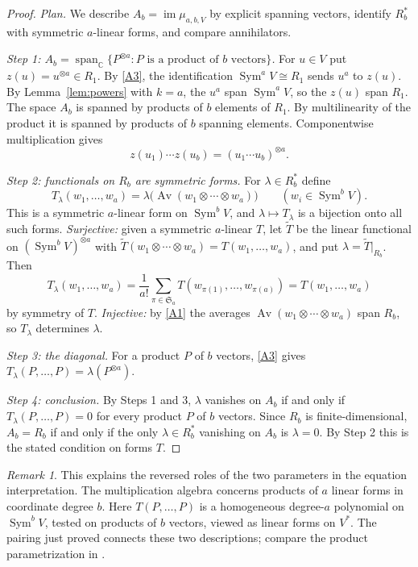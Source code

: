 \documentclass[11pt]{article}
\theoremstyle{remark}
\newtheorem{remark}[theorem]{Remark}
\DeclareMathOperator{\Sym}{Sym}
\DeclareMathOperator{\Av}{Av}
\newcommand{\C}{\mathbb C}
\newcommand{\Sa}{\mathfrak S_a}
\begin{document}
\begin{proof}
\emph{Plan.} We describe $A_b=\operatorname{im}\mu_{a,b,V}$ by explicit
spanning vectors, identify $R_b^*$ with symmetric $a$-linear forms, and
compare annihilators.

\emph{Step 1: $A_b=\operatorname{span}_{\C}\{P^{\otimes a}: P\text{ is a
product of }b\text{ vectors}\}$.}
For $u\in V$ put $z(u)=u^{\otimes a}\in R_1$. By \ref{A3}, the
identification $\Sym^aV\cong R_1$ sends $u^a$ to $z(u)$. By
Lemma~\ref{lem:powers} with $k=a$, the $u^a$ span $\Sym^aV$, so the $z(u)$
span $R_1$. The space $A_b$ is spanned by products of $b$ elements of
$R_1$. By multilinearity of the product it is spanned by products of $b$
spanning elements. Componentwise multiplication gives
\[
 z(u_1)\cdots z(u_b)=(u_1\cdots u_b)^{\otimes a}.
\]

\emph{Step 2: functionals on $R_b$ are symmetric forms.}
For $\lambda\in R_b^*$ define
\[
 T_\lambda(w_1,\ldots,w_a)
 =\lambda\bigl(\Av(w_1\otimes\cdots\otimes w_a)\bigr)
 \qquad(w_i\in\Sym^bV).
\]
This is a symmetric $a$-linear form on $\Sym^bV$, and
$\lambda\mapsto T_\lambda$ is a bijection onto all such forms.
\emph{Surjective:} given a symmetric $a$-linear $T$, let $\widetilde T$ be
the linear functional on $(\Sym^bV)^{\otimes a}$ with
$\widetilde T(w_1\otimes\cdots\otimes w_a)=T(w_1,\ldots,w_a)$, and put
$\lambda=\widetilde T|_{R_b}$. Then
\[
 T_\lambda(w_1,\ldots,w_a)
 =\frac1{a!}\sum_{\pi\in\Sa}T(w_{\pi(1)},\ldots,w_{\pi(a)})
 =T(w_1,\ldots,w_a)
\]
by symmetry of $T$.
\emph{Injective:} by \ref{A1} the averages
$\Av(w_1\otimes\cdots\otimes w_a)$ span $R_b$, so $T_\lambda$ determines
$\lambda$.

\emph{Step 3: the diagonal.}
For a product $P$ of $b$ vectors, \ref{A3} gives
$T_\lambda(P,\ldots,P)=\lambda(P^{\otimes a})$.

\emph{Step 4: conclusion.}
By Steps 1 and 3, $\lambda$ vanishes on $A_b$ if and only if
$T_\lambda(P,\ldots,P)=0$ for every product $P$ of $b$ vectors. Since
$R_b$ is finite-dimensional, $A_b=R_b$ if and only if the only
$\lambda\in R_b^*$ vanishing on $A_b$ is $\lambda=0$. By Step 2 this is the
stated condition on forms $T$.
\end{proof}

\begin{remark}
This explains the reversed roles of the two parameters in the equation
interpretation. The multiplication algebra concerns products of $a$ linear
forms in coordinate degree $b$. Here $T(P,\ldots,P)$ is a homogeneous
degree-$a$ polynomial on $\Sym^b V$, tested on products of $b$ vectors,
viewed as linear forms on $V^*$. The pairing just proved connects these two
descriptions; compare the product parametrization in
\cite[Section~2]{RSW}.
\end{remark}
\end{document}
